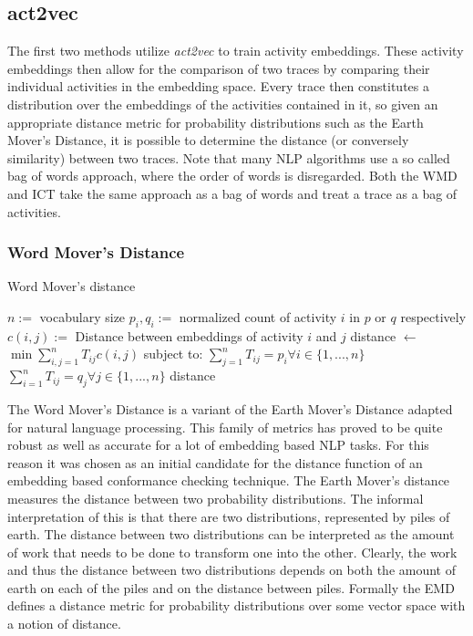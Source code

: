 \documentclass[runningheads]{template/llncs}
\begin{document}
\subsection{act2vec}
The first two methods utilize \emph{act2vec} to train activity embeddings.
These activity embeddings then allow for the comparison of two traces by comparing their individual activities in the embedding space.
Every trace then constitutes a distribution over the embeddings of the activities contained in it, so given an appropriate distance metric for probability distributions such as the Earth Mover's Distance, it is possible to determine the distance (or conversely similarity) between two traces.
Note that many NLP algorithms use a so called bag of words approach, where the order of words is disregarded.
Both the WMD and ICT take the same approach as a bag of words and treat a trace as a bag of activities.

\subsubsection{Word Mover's Distance}


\begin{algorithm}
	\caption{Word Mover's distance}\label{alg:wmd}
	\begin{algorithmic}
		\State $n:=$ vocabulary size
		\State $p_i,q_i := $ normalized count of activity $i$ in $p$ or $q$ respectively
		\State $c(i,j) :=$ Distance between embeddings of activity $i$ and $j$
		\State distance $\gets$ $\min \sum_{i,j=1}^n T_{ij}c(i,j)$
		\State subject to:
		\State $\sum_{j=1}^{n}T_{ij}=p_i \forall i \in \{1,...,n\}$ 
		\State $\sum_{i=1}^{n}T_{ij}=q_j \forall j \in \{1,...,n\}$ 
		\State \Return distance
		\EndFunction
	\end{algorithmic}
\end{algorithm}
The Word Mover's Distance \cite{KSKW15} is a variant of the Earth Mover's Distance \cite{RTGu98} adapted for natural language processing.
This family of metrics has proved to be quite robust as well as accurate for a lot of embedding based NLP tasks.
For this reason it was chosen as an initial candidate for the distance function of an embedding based conformance checking technique.
The Earth Mover's distance measures the distance between two probability distributions.
The informal interpretation of this is that there are two distributions, represented by piles of earth.
The distance between two distributions can be interpreted as the amount of work that needs to be done to transform one into the other.
Clearly, the work and thus the distance between two distributions depends on both the amount of earth on each of the piles and on the distance between piles.
Formally the EMD defines a distance metric for probability distributions over some vector space with a notion of distance.
\end{document}
